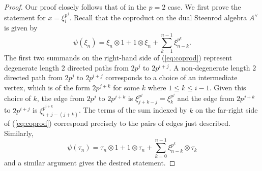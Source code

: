 \documentclass{amsart}
\theoremstyle{definition}
\theoremstyle{plain}
\numberwithin{theorem}{section}
\numberwithin{equation}{section}
\numberwithin{figure}{section}
\newcommand{\0}{\langle 0 \rangle }
\begin{document}
\begin{proof}
Our proof closely follows that of \cite[Theorem 1.5]{Larson22} in the $p = 2$ case. We first prove the statement for $x = \xi_i^{p^j}$. Recall that the coproduct on the dual Steenrod algebra $A^\vee$ is given by
\begin{equation} \label{eq:coprod}
\psi(\xi_n) = \xi_n \otimes 1 + 1 \otimes \xi_n + \sum_{k = 1}^{n - 1} \xi_{n - k}^{p^k}.
\end{equation}
The first two summands on the right-hand side of (\ref{eq:coprod}) represent degenerate length $2$ directed paths from $2 p^j$ to $2 p^{i + j}$. A non-degenerate length $2$ directed path from $2 p^j$ to $2 p^{i + j}$ corresponds to a choice of an intermediate vertex, which is of the form $2 p^{j + k}$ for some $k$ where $1 \leq k \leq i - 1$. Given this choice of $k$, the edge from $2p^j$ to $2p^{j + k}$ is $\xi_{j + k - j}^{p^j} = \xi_k^{p^j}$ and the edge from $2p^{j + k}$ to $2 p^{i + j}$ is $\xi_{i + j - ( j + k)}^{p^{i + k}}$. The terms of the sum indexed by $k$ on the far-right side of (\ref{eq:coprod}) correspond precisely to the pairs of edges just described. 
Similarly, 
\[
\psi(\tau_n) = \tau_n \otimes 1 + 1 \otimes \tau_n + \sum_{k = 0}^{n - 1} \xi_{n - k}^{p^k} \otimes \tau_k
\]
and a similar argument gives the desired statement.
\end{proof} 
\end{document}
